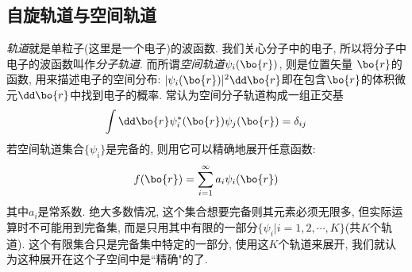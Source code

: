 \subsection{自旋轨道与空间轨道}
 \label{sec2.2.1}
 \emph{轨道}就是单粒子(这里是一个电子)的波函数. 我们关心分子中的电子, 所以将分子中电子的波函数叫作\emph{分子轨道}. 而所谓\emph{空间轨道}$\psi_i(\bo{r})$, 则是位置矢量 $\bo{r}$的函数, 用来描述电子的空间分布: $|\psi_i(\bo{r})|^2\dd \bo{r}$即在包含$\bo{r}$的体积微元$\dd\bo{r}$中找到电子的概率. 常认为空间分子轨道构成一组正交基
 \begin{equation}
 \int\dd\bo{r}\psi_i^*(\bo{r})\psi_j(\bo{r})=\delta_{ij}
 \end{equation}
 若空间轨道集合$\{\psi_i \}$是完备的, 则用它可以精确地展开任意函数:
 \begin{equation}
 f(\bo{r})=\sum_{i=1}^{\infty}a_i\psi_i(\bo{r})
 \end{equation}
其中$a_i$是常系数. 
绝大多数情况, 
这个集合想要完备则其元素必须无限多, 
但实际运算时不可能用到完备集, 
而是只用其中有限的一部分$\{\psi_i|i=1,2,\cdots,K\}$(共$K$个轨道). 
这个有限集合只是完备集中特定的一部分, 
使用这$K$个轨道来展开, 
我们就认为这种展开在这个子空间中是``精确"的了.


